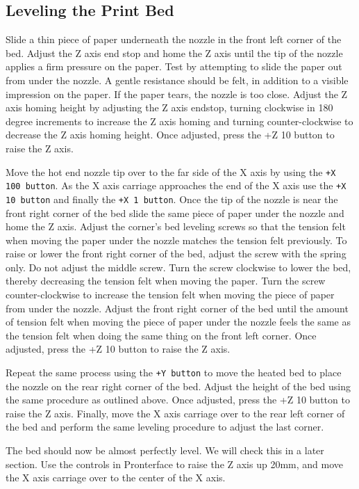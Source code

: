 \subsection{Leveling the Print Bed}
Slide a thin piece of paper underneath the nozzle in the front left corner of the bed. Adjust the Z axis end stop and home the Z axis until the tip of the nozzle applies a firm pressure on the paper. Test by attempting to slide the paper out from under the nozzle. A gentle resistance should be felt, in addition to a visible impression on the paper. If the paper tears, the nozzle is too close. Adjust the Z axis homing height by adjusting the Z axis endstop, turning clockwise in 180 degree increments to increase the Z axis homing and turning counter-clockwise to decrease the Z axis homing height. Once adjusted, press the +Z 10 button to raise the Z axis.

Move the hot end nozzle tip over to the far side of the X axis by using the \texttt{+X 100 button}. As the X axis carriage approaches the end of the X axis use the \texttt{+X 10 button} and finally the \texttt{+X 1 button}. Once the tip of the nozzle is near the front right corner of the bed slide the same piece of paper under the nozzle and home the Z axis. Adjust the corner's bed leveling screws so that the tension felt when moving the paper under the nozzle matches the tension felt previously. To raise or lower the front right corner of the bed, adjust the screw with the spring only. Do not adjust the middle screw. Turn the screw clockwise to lower the bed, thereby decreasing the tension felt when moving the paper. Turn the screw counter-clockwise to increase the tension felt when moving the piece of paper from under the nozzle. Adjust the front right corner of the bed until the amount of tension felt when moving the piece of paper under the nozzle feels the same as the tension felt when doing the same thing on the front left corner. Once adjusted, press the +Z 10 button to raise the Z axis. 

Repeat the same process using the \texttt{+Y button} to move the heated bed to place the nozzle on the rear right corner of the bed. Adjust the height of the bed using the same procedure as outlined above. Once adjusted, press the +Z 10 button to raise the Z axis. Finally, move the X axis carriage over to the rear left corner of the bed and perform the same leveling procedure to adjust the last corner.

The bed should now be almost perfectly level. We will check this in a later section. Use the controls in Pronterface to raise the Z axis up 20mm, and move the X axis carriage over to the center of the X axis.

